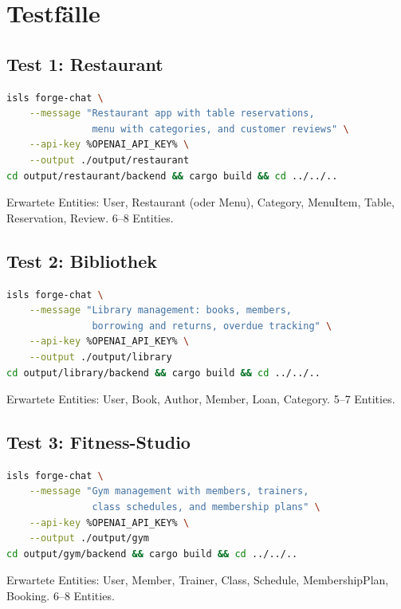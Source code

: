 \documentclass[11pt,a4paper]{article}
\begin{document}
\section{Testf\"alle}

\subsection{Test 1: Restaurant}

\begin{lstlisting}[language=bash]
isls forge-chat \
    --message "Restaurant app with table reservations,
               menu with categories, and customer reviews" \
    --api-key %OPENAI_API_KEY% \
    --output ./output/restaurant
cd output/restaurant/backend && cargo build && cd ../../..
\end{lstlisting}

Erwartete Entities: User, Restaurant (oder Menu), Category, MenuItem,
Table, Reservation, Review. 6--8 Entities.

\subsection{Test 2: Bibliothek}

\begin{lstlisting}[language=bash]
isls forge-chat \
    --message "Library management: books, members,
               borrowing and returns, overdue tracking" \
    --api-key %OPENAI_API_KEY% \
    --output ./output/library
cd output/library/backend && cargo build && cd ../../..
\end{lstlisting}

Erwartete Entities: User, Book, Author, Member, Loan, Category. 5--7 Entities.

\subsection{Test 3: Fitness-Studio}

\begin{lstlisting}[language=bash]
isls forge-chat \
    --message "Gym management with members, trainers,
               class schedules, and membership plans" \
    --api-key %OPENAI_API_KEY% \
    --output ./output/gym
cd output/gym/backend && cargo build && cd ../../..
\end{lstlisting}

Erwartete Entities: User, Member, Trainer, Class, Schedule,
MembershipPlan, Booking. 6--8 Entities.
\end{document}
